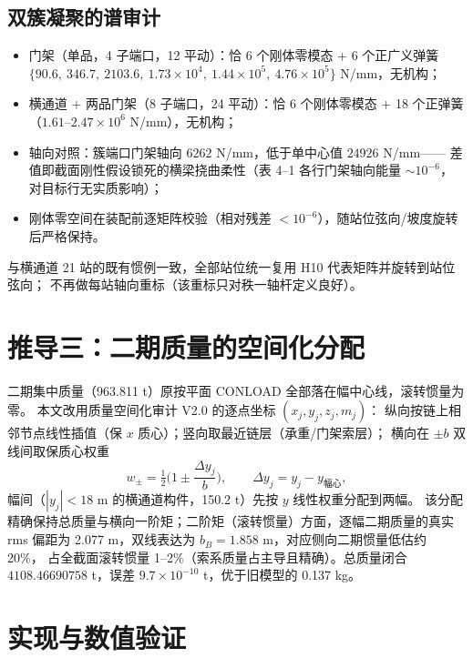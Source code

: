 \documentclass[11pt,a4paper]{ctexart}
\begin{document}
\subsection{双簇凝聚的谱审计}

\begin{itemize}
  \item 门架（单品，4 子端口，12 平动）：恰 6 个刚体零模态 + 6 个正广义弹簧
        $\{90.6,\ 346.7,\ 2103.6,\ 1.73\times10^4,\ 1.44\times10^5,\ 4.76\times10^5\}$ N/mm，无机构；
  \item 横通道 + 两品门架（8 子端口，24 平动）：恰 6 个刚体零模态 + 18 个正弹簧
        （$1.61\text{--}2.47\times10^6$ N/mm），无机构；
  \item 轴向对照：簇端口门架轴向 $6262$ N/mm，低于单中心值 $24926$ N/mm——
        差值即截面刚性假设锁死的横梁挠曲柔性（表 4--1 各行门架轴向能量 $\sim10^{-6}$，
        对目标行无实质影响）；
  \item 刚体零空间在装配前逐矩阵校验（相对残差 $<10^{-6}$），随站位弦向/坡度旋转后严格保持。
\end{itemize}

与横通道 21 站的既有惯例一致，全部站位统一复用 H10 代表矩阵并旋转到站位弦向；
不再做每站轴向重标（该重标只对秩一轴杆定义良好）。

\section{推导三：二期质量的空间化分配}\label{sec:mass}

二期集中质量（963.811 t）原按平面 CONLOAD 全部落在幅中心线，滚转惯量为零。
本文改用质量空间化审计 V2.0 的逐点坐标 $(x_j,y_j,z_j,m_j)$：
纵向按链上相邻节点线性插值（保 $x$ 质心）；竖向取最近链层（承重/门架索层）；
横向在 $\pm b$ 双线间取保质心权重
\begin{equation}
w_{\pm}=\tfrac12\Big(1\pm\frac{\Delta y_j}{b}\Big),\qquad \Delta y_j=y_j-y_{\text{幅心}},
\end{equation}
幅间（$|y_j|<18$ m 的横通道构件，150.2 t）先按 $y$ 线性权重分配到两幅。
该分配精确保持总质量与横向一阶矩；二阶矩（滚转惯量）方面，逐幅二期质量的真实
rms 偏距为 2.077 m，双线表达为 $b_B=1.858$ m，对应侧向二期惯量低估约 20\%，
占全截面滚转惯量 1--2\%（索系质量占主导且精确）。总质量闭合
$4108.46690758$ t，误差 $9.7\times10^{-10}$ t，优于旧模型的 0.137 kg。

\section{实现与数值验证}\label{sec:impl}
\end{document}
